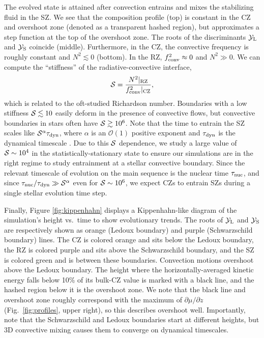 The evolved state is attained after convection entrains and mixes the stabilizing fluid in the SZ.
We see that the composition profile (top) is constant in the CZ and overshoot zone (denoted as a transparent hashed region), but approximates a step function at the top of the overshoot zone.
The roots of the discriminants $\mathcal{Y}_{\rm{L}}$ and $\mathcal{Y}_{\rm{S}}$ coincide (middle).
Furthermore, in the CZ, the convective frequency is roughly constant and $N^2 \lesssim 0$ (bottom).
In the RZ, $f_{\rm{conv}}^2 \approx 0$ and $N^2 \gg 0$.
We can compute the ``stiffness'' of the radiative-convective interface,
\begin{equation}
\mS = \frac{N^2|_{\rm{RZ}}}{f_{\rm{conv}}^2|_{\rm{CZ}}},
\label{eqn:stiffness}
\end{equation}
which is related to the oft-studied Richardson number.
Boundaries with a low stiffness $\mathcal{S} \lesssim 10$ easily deform in the presence of convective flows, but convective boundaries in stars often have $\mathcal{S} \gtrsim 10^6$.
Note that the time to entrain the SZ scales like $\mathcal{S}^{\alpha}\tau_{\rm{dyn}}$, where $\alpha$ is an $\mathcal{O}(1)$ positive exponent and $\tau_{\rm{dyn}}$ is the dynamical timescale \citep{turner_1968, fuentes_cumming_2020}.
Due to this $\mathcal{S}$ dependence, we study a large value of $\mathcal{S} \sim 10^{4}$ in the statistically-stationary state to ensure our simulations are in the right regime to study entrainment at a stellar convective boundary.
Since the relevant timescale of evolution on the main sequence is the nuclear time $\tau_{\rm{nuc}}$, and since $\tau_{\rm{nuc}}/\tau_{\rm{dyn}} \gg \mathcal{S}^{\alpha}$ even for $\mathcal{S} \sim 10^6$, we expect CZs to entrain SZs during a single stellar evolution time step.

Finally, Figure \ref{fig:kippenhahn} displays a Kippenhahn-like diagram of the simulation's height vs.~time to show evolutionary trends.
The roots of $\mathcal{Y}_{\rm{L}}$ and $\mathcal{Y}_{\rm{S}}$ are respectively shown as orange (Ledoux boundary) and purple (Schwarzschild boundary) lines.
The CZ is colored orange and sits below the Ledoux boundary, the RZ is colored purple and sits above the Schwarzschild boundary, and the SZ is colored green and is between these boundaries.
Convection motions overshoot above the Ledoux boundary.
The height where the horizontally-averaged kinetic energy falls below 10\% of its bulk-CZ value is marked with a black line, and the hashed region below it is the overshoot zone.
We note that the black line and overshoot zone roughly correspond with the maximum of $\partial\mu/\partial z$ (Fig.~\ref{fig:profiles}, upper right), so this describes overshoot well.
Importantly, note that the Schwarzschild and Ledoux boundaries start at different heights, but 3D convective mixing causes them to converge on dynamical timescales.


